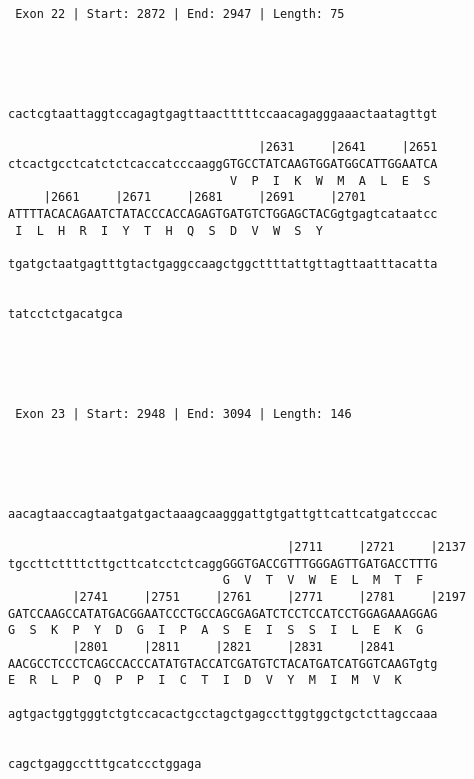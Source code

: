 \documentclass{article}
\begin{document}
\begin{Verbatim}
 Exon 22 | Start: 2872 | End: 2947 | Length: 75 




                                                            
cactcgtaattaggtccagagtgagttaactttttccaacagagggaaactaatagttgt
                                                            
                                   |2631     |2641     |2651
ctcactgcctcatctctcaccatcccaaggGTGCCTATCAAGTGGATGGCATTGGAATCA
                               V  P  I  K  W  M  A  L  E  S 
     |2661     |2671     |2681     |2691     |2701          
ATTTTACACAGAATCTATACCCACCAGAGTGATGTCTGGAGCTACGgtgagtcataatcc
 I  L  H  R  I  Y  T  H  Q  S  D  V  W  S  Y                
                                                            
tgatgctaatgagtttgtactgaggccaagctggcttttattgttagttaatttacatta
                                                            
                
tatcctctgacatgca
                




 Exon 23 | Start: 2948 | End: 3094 | Length: 146 




                                                            
aacagtaaccagtaatgatgactaaagcaagggattgtgattgttcattcatgatcccac
                                                            
                                       |2711     |2721     |2137
tgccttcttttcttgcttcatcctctcaggGGGTGACCGTTTGGGAGTTGATGACCTTTG
                              G  V  T  V  W  E  L  M  T  F  
         |2741     |2751     |2761     |2771     |2781     |2197
GATCCAAGCCATATGACGGAATCCCTGCCAGCGAGATCTCCTCCATCCTGGAGAAAGGAG
G  S  K  P  Y  D  G  I  P  A  S  E  I  S  S  I  L  E  K  G  
         |2801     |2811     |2821     |2831     |2841      
AACGCCTCCCTCAGCCACCCATATGTACCATCGATGTCTACATGATCATGGTCAAGTgtg
E  R  L  P  Q  P  P  I  C  T  I  D  V  Y  M  I  M  V  K     
                                                            
agtgactggtgggtctgtccacactgcctagctgagccttggtggctgctcttagccaaa
                                                            
                           
cagctgaggcctttgcatccctggaga
                           





\end{Verbatim}
\end{document}
